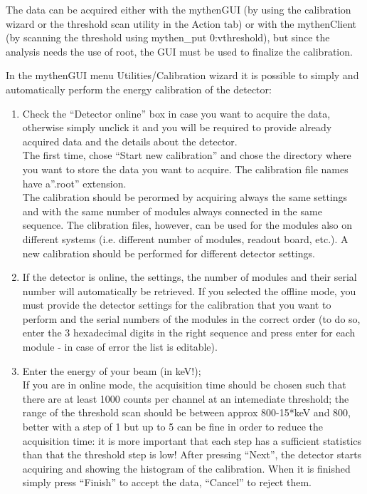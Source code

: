 \documentclass{report}
\begin{document}
The data can be acquired either with the mythenGUI (by using the calibration wizard or the threshold scan utility in the Action tab) or with the mythenClient (by scanning the threshold using mythen\_put 0:vthreshold), but since the analysis needs the use of root, the GUI must be used to finalize the calibration.

In the mythenGUI menu Utilities/Calibration wizard it is possible to simply and automatically perform the energy calibration of the detector:
\begin{enumerate}
\item 
Check the ``Detector online'' box in case you want to acquire the data, otherwise simply unclick it and you will be required to provide already acquired data and the details about the detector.\\
The first time, chose ``Start new calibration'' and chose the directory where you want to store the data you want to acquire. The calibration file names have a''.root'' extension. \\
The calibration should be perormed by acquiring always the same settings and with the same number of modules always connected in the same sequence. The clibration files, however, can be used for the modules also on different systems (i.e. different number of modules, readout board, etc.). A new calibration should be performed for different detector settings.
\item If the detector is online, the settings, the number of modules and their serial number will automatically be retrieved. If you selected the offline mode, you must provide the detector settings for the calibration that you want to perform and the serial numbers of the modules in the correct order (to do so, enter the 3 hexadecimal digits in the right sequence and press enter for each module - in case of error the list is editable).
\item Enter the energy  of your beam (in keV!); \\
If you are in online mode, the acquisition time should be chosen such that there are at least 1000 counts per channel at an intemediate threshold; the range of the threshold scan should be between approx 800-15*keV and 800, better with a step of 1 but up to 5 can be fine in order to reduce the acquisition time: it is more important that each step has a sufficient statistics than that the threshold step is low! After pressing ``Next'', the detector starts acquiring and showing the histogram of the calibration. When it is finished simply press ``Finish'' to accept the data, ``Cancel'' to reject them.\\

\end{enumerate}
\end{document}
